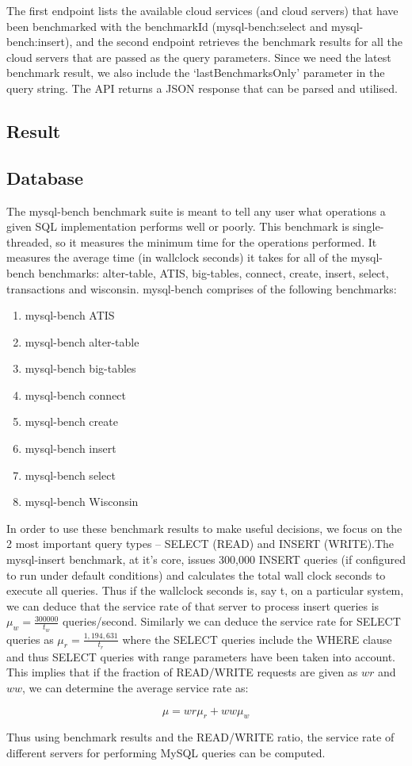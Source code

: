 The first endpoint lists the available cloud services (and cloud servers) that have been
benchmarked with the benchmarkId (mysql-bench:select and mysql-bench:insert), and the
second endpoint retrieves the benchmark results for all the cloud servers that are passed as the
query parameters. Since we need the latest benchmark result, we also include the
‘lastBenchmarksOnly’ parameter in the query string. The API returns a JSON response that
can be parsed and utilised.

\subsection{Result}


\subsection{Database}

The mysql-bench benchmark suite is meant to tell any user what operations a given SQL implementation performs well or poorly. This benchmark is single-threaded, so it measures the minimum time for the operations performed. It measures the average time (in wallclock seconds) it takes for all of the mysql-bench benchmarks: alter-table, ATIS, big-tables, connect, create, insert, select, transactions and wisconsin. mysql-bench comprises of the following benchmarks:


\begin{enumerate}
  \item mysql-bench ATIS
  \item mysql-bench alter-table
  \item mysql-bench big-tables
  \item mysql-bench connect
  \item mysql-bench create
  \item mysql-bench insert
  \item mysql-bench select
  \item mysql-bench Wisconsin 
\end{enumerate}


In order to use these benchmark results to make useful decisions, we focus on the 2 most important query types – SELECT (READ) and INSERT (WRITE).The mysql-insert benchmark, at it’s core, issues 300,000 INSERT queries (if configured to run under default conditions) and calculates the total wall clock seconds to execute all queries. Thus if the wallclock seconds is, say t, on a particular system, we can deduce that the service rate of that server to process insert queries is $ \mu_w = \frac{300000}{t_w} $ queries/second. Similarly we can deduce the service rate for SELECT queries as $ \mu_r = \frac{1,194,631}{t_r} $ where the SELECT queries include the WHERE clause and thus SELECT queries with range parameters have been taken into account. This implies that if the fraction of READ/WRITE requests are given as $wr$ and $ww$, we can determine the average service rate as:

\begin{equation}\label{eq:db_workload}
\mu = wr \mu_r + ww \mu_w
\end{equation}

Thus using benchmark results and the READ/WRITE ratio, the service rate of different servers for performing MySQL queries can be computed.






